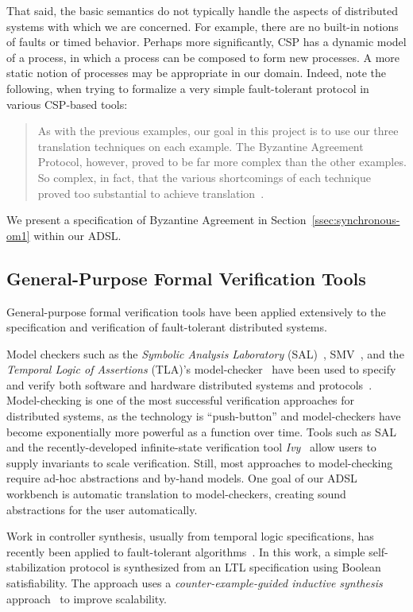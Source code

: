 That said, the basic semantics do not typically handle the aspects of distributed systems
with which we are concerned. For example, there are no built-in notions of
faults or timed behavior. Perhaps more significantly, CSP has a dynamic
model of a process, in which a process can be composed to form new processes. A
more static notion of processes may be appropriate in our domain. Indeed, note
the following, when trying to formalize a very simple fault-tolerant protocol in
various CSP-based tools:

\begin{quote}
As with the previous examples, our goal in this project is to use our three
translation techniques on each example. The Byzantine Agreement Protocol,
however, proved to be far more complex than the other examples. So complex, in
fact, that the various shortcomings of each technique proved too substantial to
achieve translation~\cite{csp-masters}.
\end{quote}
\noindent
We present a specification of Byzantine Agreement in Section~\ref{ssec:synchronous-om1} within our ADSL.

\subsection{General-Purpose Formal Verification Tools}
General-purpose formal verification tools have been applied extensively to the specification and verification of fault-tolerant distributed systems.

Model checkers such as the \emph{Symbolic Analysis Laboratory}
(SAL)~\cite{SRI:SAL}, SMV~\cite{nusmv}, and the \emph{Temporal Logic of
  Assertions} (TLA)'s model-checker~\cite{tla} have been used to specify and
verify both software and hardware distributed systems and
protocols~\cite{Rushby-OM1,pike-afm,brown_pike_06,pike_johnson:emsoft,amazon-tla,Dutertre-Sorea-2004}. Model-checking
is one of the most successful verification approaches for distributed systems,
as the technology is ``push-button'' and model-checkers have become
exponentially more powerful as a function over time. Tools such as SAL and the recently-developed infinite-state verification tool \emph{Ivy}~\cite{ivy} allow users to supply invariants to scale verification. Still, most approaches to
model-checking require ad-hoc abstractions and by-hand models. One goal of our
ADSL workbench is automatic translation to model-checkers, creating sound
abstractions for the user automatically.

Work in controller synthesis, usually from temporal logic specifications, has
recently been applied to fault-tolerant algorithms~\cite{BloemBJ16}. In this
work, a simple self-stabilization protocol is synthesized from an LTL
specification using Boolean satisfiability. The approach uses a \emph{counter-example-guided inductive
  synthesis} approach~\cite{Solar} to improve scalability.

